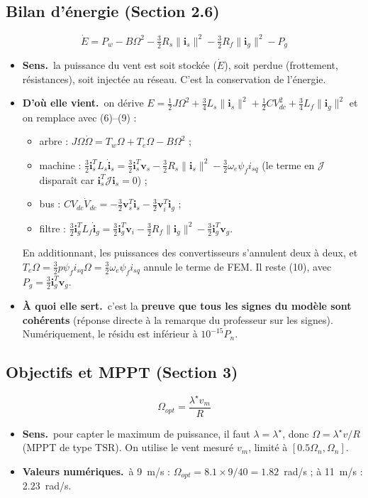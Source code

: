 \documentclass[11pt,a4paper]{article}
\newcommand{\bv}[1]{\mathbf{#1}}
\newcommand{\Jm}{\boldsymbol{\mathcal{J}}}
\newenvironment{expl}{\begin{itemize}[leftmargin=1.2em,itemsep=2pt,topsep=2pt]}{\end{itemize}}
\newcommand{\sens}{\item \textbf{Sens.}~}
\newcommand{\origine}{\item \textbf{D'où elle vient.}~}
\newcommand{\num}{\item \textbf{Valeurs numériques.}~}
\newcommand{\role}{\item \textbf{À quoi elle sert.}~}
\begin{document}
\subsection{Bilan d'énergie (Section 2.6)}
\begin{equation}\tag{10}
\dot E = P_w - B\Omega^2 - \tfrac32R_s\|\bv{i}_s\|^2 - \tfrac32R_f\|\bv{i}_g\|^2 - P_g
\end{equation}
\begin{expl}
\sens la puissance du vent est soit stockée ($\dot E$), soit perdue (frottement, résistances), soit injectée
au réseau. C'est la conservation de l'énergie.
\origine on dérive $E=\frac12J\Omega^2+\frac34L_s\|\bv i_s\|^2+\frac12CV_{dc}^2+\frac34L_f\|\bv i_g\|^2$ et on
remplace avec (6)--(9) :
\begin{itemize}[itemsep=1pt]
\item arbre : $J\Omega\dot\Omega=T_w\Omega+T_e\Omega-B\Omega^2$ ;
\item machine : $\frac32\bv i_s^TL_s\dot{\bv i}_s=\frac32\bv i_s^T\bv v_s-\frac32R_s\|\bv i_s\|^2-\frac32\omega_e\psi_fi_{sq}$
(le terme en $\Jm$ disparaît car $\bv i_s^T\Jm\bv i_s=0$) ;
\item bus : $CV_{dc}\dot V_{dc}=-\frac32\bv v_s^T\bv i_s-\frac32\bv v_i^T\bv i_g$ ;
\item filtre : $\frac32\bv i_g^TL_f\dot{\bv i}_g=\frac32\bv i_g^T\bv v_i-\frac32R_f\|\bv i_g\|^2-\frac32\bv i_g^T\bv v_g$.
\end{itemize}
En additionnant, les puissances des convertisseurs s'annulent deux à deux, et
$T_e\Omega=\frac32p\psi_fi_{sq}\Omega=\frac32\omega_e\psi_fi_{sq}$ annule le terme de FEM. Il reste (10),
avec $P_g=\frac32\bv i_g^T\bv v_g$.
\role c'est la \textbf{preuve que tous les signes du modèle sont cohérents} (réponse directe à la remarque du
professeur sur les signes). Numériquement, le résidu est inférieur à $10^{-15}P_n$.
\end{expl}

\subsection{Objectifs et MPPT (Section 3)}
\begin{equation}\tag{11}
\Omega_{opt}=\frac{\lambda^\star v_m}{R}
\end{equation}
\begin{expl}
\sens pour capter le maximum de puissance, il faut $\lambda=\lambda^\star$, donc $\Omega=\lambda^\star v/R$
(MPPT de type TSR). On utilise le vent mesuré $v_m$, limité à $[0.5\Omega_n,\Omega_n]$.
\num à 9~m/s : $\Omega_{opt}=8.1\times9/40=1.82$~rad/s ; à 11~m/s : 2.23~rad/s.
\end{expl}
\end{document}
